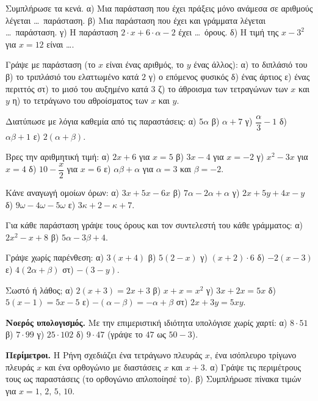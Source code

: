 

\ex Συμπλήρωσε τα κενά. α) Μια παράσταση που έχει πράξεις μόνο ανάμεσα σε αριθμούς λέγεται \dots\ παράσταση. \quad β) Μια παράσταση που έχει και γράμματα λέγεται \dots\ παράσταση. \quad γ) Η παράσταση $2\cdot x+6\cdot\alpha-2$ έχει \dots\ όρους. \quad δ) Η τιμή της $x-3^2$ για $x=12$ είναι \dots.

\ex Γράψε με παράσταση (το $x$ είναι ένας αριθμός, το $y$ ένας άλλος): α) το διπλάσιό του \quad β) το τριπλάσιό του ελαττωμένο κατά $2$ \quad γ) ο επόμενος φυσικός \quad δ) ένας άρτιος \quad ε) ένας περιττός \quad στ) το μισό του αυξημένο κατά $3$ \quad ζ) το άθροισμα των τετραγώνων των $x$ και $y$ \quad η) το τετράγωνο του αθροίσματος των $x$ και $y$.

\ex Διατύπωσε με λόγια καθεμία από τις παραστάσεις: α) $5\alpha$ \quad β) $\alpha+7$ \quad γ) $\dfrac{\alpha}{3}-1$ \quad δ) $\alpha\beta+1$ \quad ε) $2(\alpha+\beta)$.

\ex Βρες την αριθμητική τιμή: α) $2x+6$ για $x=5$ \quad β) $3x-4$ για $x=-2$ \quad γ) $x^2-3x$ για $x=4$ \quad δ) $10-\dfrac{x}{2}$ για $x=6$ \quad ε) $\alpha\beta+\alpha$ για $\alpha=3$ και $\beta=-2$.

\ex Κάνε αναγωγή ομοίων όρων: α) $3x+5x-6x$ \quad β) $7\alpha-2\alpha+\alpha$ \quad γ) $2x+5y+4x-y$ \quad δ) $9\omega-4\omega-5\omega$ \quad ε) $3\kappa+2-\kappa+7$.

\ex Για κάθε παράσταση γράψε τους όρους και τον συντελεστή του κάθε γράμματος: α) $2x^2-x+8$ \quad β) $5\alpha-3\beta+4$.

\ex Γράψε χωρίς παρένθεση: α) $3(x+4)$ \quad β) $5(2-x)$ \quad γ) $(x+2)\cdot6$ \quad δ) $-2(x-3)$ \quad ε) $4(2\alpha+\beta)$ \quad στ) $-(3-y)$.

\ex Σωστό ή λάθος; α) $2(x+3)=2x+3$ \quad β) $x+x=x^2$ \quad γ) $3x+2x=5x$ \quad δ) $5(x-1)=5x-5$ \quad ε) $-(\alpha-\beta)=-\alpha+\beta$ \quad στ) $2x+3y=5xy$.

\ex \textbf{Νοερός υπολογισμός.} Με την επιμεριστική ιδιότητα υπολόγισε χωρίς χαρτί: α) $8\cdot51$ \quad β) $7\cdot99$ \quad γ) $25\cdot102$ \quad δ) $9\cdot47$ (γράψε το $47$ ως $50-3$).


\ex \textbf{Περίμετροι.} Η Ρήνη σχεδιάζει ένα τετράγωνο πλευράς $x$, ένα ισόπλευρο τρίγωνο πλευράς $x$ και ένα ορθογώνιο με διαστάσεις $x$ και $x+3$. α) Γράψε τις περιμέτρους τους ως παραστάσεις (το ορθογώνιο απλοποίησέ το). β) Συμπλήρωσε πίνακα τιμών για $x=1,\,2,\,5,\,10$.

